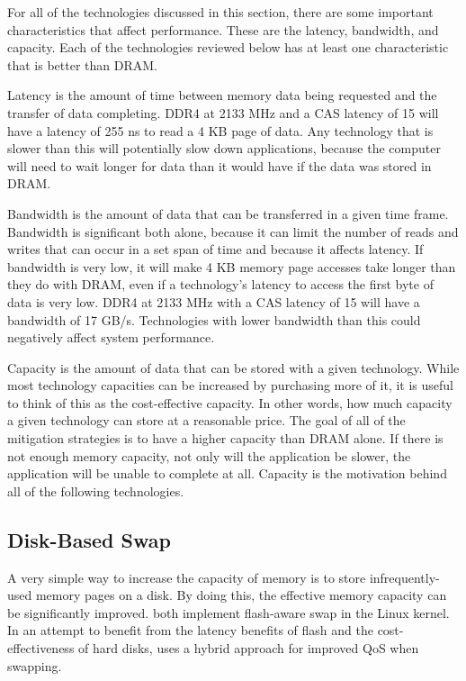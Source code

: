 \documentclass[doublespace,nopageskip]{VTthesis}
\begin{document}
For all of the technologies discussed in this section, there are some important characteristics that affect performance. These are the latency, bandwidth, and capacity. Each of the technologies reviewed below has at least one characteristic that is better than DRAM.

Latency is the amount of time between memory data being requested and the transfer of data completing. DDR4 at 2133 MHz and a CAS latency of 15 will have a latency of 255 ns to read a 4 KB page of data. Any technology that is slower than this will potentially slow down applications, because the computer will need to wait longer for data than it would have if the data was stored in DRAM.

Bandwidth is the amount of data that can be transferred in a given time frame. Bandwidth is significant both alone, because it can limit the number of reads and writes that can occur in a set span of time and because it affects latency. If bandwidth is very low, it will make 4 KB memory page accesses take longer than they do with DRAM, even if a technology's latency to access the first byte of data is very low. DDR4 at 2133 MHz with a CAS latency of 15 will have a bandwidth of 17 GB/s. Technologies with lower bandwidth than this could negatively affect system performance.

Capacity is the amount of data that can be stored with a given technology. While most technology capacities can be increased by purchasing more of it, it is useful to think of this as the cost-effective capacity. In other words, how much capacity a given technology can store at a reasonable price. The goal of all of the mitigation strategies is to have a higher capacity than DRAM alone. If there is not enough memory capacity, not only will the application be slower, the application will be unable to complete at all. Capacity is the motivation behind all of the following technologies.

\subsection{Disk-Based Swap}\label{ss:disk-based_swap}
A very simple way to increase the capacity of memory is to store infrequently-used memory pages on a disk. By doing this, the effective memory capacity can be significantly improved.\cite{fass,flashawareswap} both implement flash-aware swap in the Linux kernel. In an attempt to benefit from the latency benefits of flash and the cost-effectiveness of hard disks, \cite{hybridswap} uses a hybrid approach for improved QoS when swapping.
\end{document}
